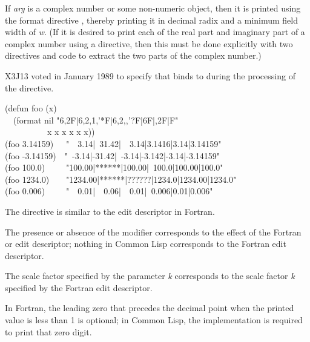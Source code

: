 \begin{flushdesc}
If \emph{arg} is a complex number or some non-numeric
object, then it is printed using the format directive ,
thereby printing it in decimal radix and a minimum field width of \emph{w}.
(If it is desired to print each of the real part and imaginary part
of a complex number using a  directive, then this must
be done explicitly with two  directives and code to
extract the two parts of the complex number.)

\begin{new}
X3J13 voted in January 1989
to specify that  binds  to 
during the processing of the  directive.
\end{new}

\begin{lisp}
(defun foo (x) \\
~~(format nil "{\Xtilde}6,2F|{\Xtilde}6,2,1,'*F|{\Xtilde}6,2,,'?F|{\Xtilde}6F|{\Xtilde},2F|{\Xtilde}F" \\
~~~~~~~~~~x x x x x x)) \\
(foo 3.14159)~~\EV\ "~~3.14|~31.42|~~3.14|3.1416|3.14|3.14159" \\
(foo -3.14159)~\EV\ "~-3.14|-31.42|~-3.14|-3.142|-3.14|-3.14159" \\
(foo 100.0)~~~~\EV\ "100.00|******|100.00|~100.0|100.00|100.0" \\
(foo 1234.0)~~~\EV\ "1234.00|******|??????|1234.0|1234.00|1234.0" \\
(foo 0.006)~~~~\EV\ "~~0.01|~~0.06|~~0.01|~0.006|0.01|0.006"
\end{lisp}

\beforenoterule
\begin{incompatibility}
The  directive is similar to the
 edit descriptor in Fortran.

The presence
or absence of the \cd{{\Xatsign}} modifier corresponds to the effect of
the Fortran  or  edit descriptor; nothing in Common Lisp
corresponds to the Fortran  edit descriptor.

The scale factor
specified by the parameter \emph{k} corresponds to the scale factor \emph{k}
specified by the Fortran  edit descriptor.

In Fortran, the leading zero that precedes the decimal point when
the printed value is less than 1 is optional; in Common Lisp, the implementation
is required to print that zero digit.


\end{incompatibility}
\end{flushdesc}
